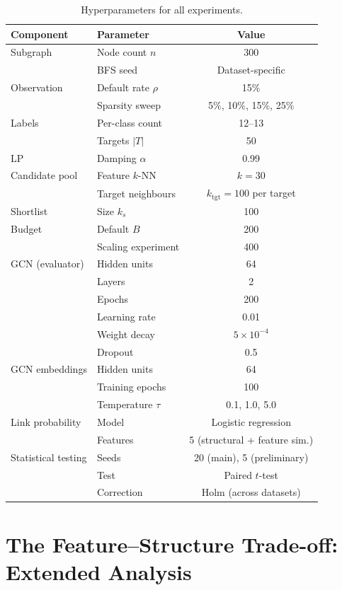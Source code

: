 \documentclass[12pt,a4paper,oneside]{report}
\begin{document}
\begin{table}[htbp]
\centering
\caption{Hyperparameters for all experiments.}
\label{tab:hyperparams}
\small
\begin{tabular}{llc}
\toprule
Component & Parameter & Value \\
\midrule
Subgraph & Node count $n$ & 300 \\
 & BFS seed & Dataset-specific \\
\midrule
Observation & Default rate $\rho$ & 15\% \\
 & Sparsity sweep & 5\%, 10\%, 15\%, 25\% \\
\midrule
Labels & Per-class count & 12--13 \\
 & Targets $|T|$ & 50 \\
\midrule
LP & Damping $\alpha$ & 0.99 \\
\midrule
Candidate pool & Feature $k$-NN & $k = 30$ \\
 & Target neighbours & $k_{\text{tgt}} = 100$ per target \\
\midrule
Shortlist & Size $k_s$ & 100 \\
\midrule
Budget & Default $B$ & 200 \\
 & Scaling experiment & 400 \\
\midrule
GCN (evaluator) & Hidden units & 64 \\
 & Layers & 2 \\
 & Epochs & 200 \\
 & Learning rate & 0.01 \\
 & Weight decay & $5 \times 10^{-4}$ \\
 & Dropout & 0.5 \\
\midrule
GCN embeddings & Hidden units & 64 \\
 & Training epochs & 100 \\
 & Temperature $\tau$ & 0.1, 1.0, 5.0 \\
\midrule
Link probability & Model & Logistic regression \\
 & Features & 5 (structural + feature sim.) \\
\midrule
Statistical testing & Seeds & 20 (main), 5 (preliminary) \\
 & Test & Paired $t$-test \\
 & Correction & Holm (across datasets) \\
\bottomrule
\end{tabular}
\end{table}


\chapter{The Feature--Structure Trade-off: Extended Analysis}
\label{app:tradeoff}
\end{document}
